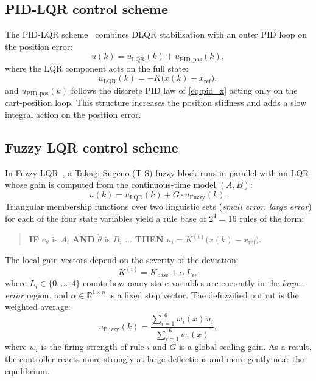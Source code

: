 \documentclass[twocolumn]{svjour3}
\begin{document}
\subsection{PID-LQR control scheme}

The PID-LQR scheme~\cite{Prasad2014,Nguyen2024} combines DLQR stabilisation with an outer PID loop on the position
error:
\begin{equation}
u(k) = u_\mathrm{LQR}(k) + u_\mathrm{PID,pos}(k),
\end{equation}
where the LQR component acts on the full state:
\begin{equation}
u_\mathrm{LQR}(k) = -K\bigl(x(k) - x_\mathrm{ref}\bigr),
\end{equation}
and $u_\mathrm{PID,pos}(k)$ follows the discrete PID law of \eqref{eq:pid_x} acting only on the
cart-position loop. This structure increases the position stiffness and adds a slow integral
action on the position error.

\subsection{Fuzzy LQR control scheme}

In Fuzzy-LQR~\cite{Nguyen2024}, a Takagi-Sugeno (T-S) fuzzy block runs in parallel with an LQR
whose gain is computed from the continuous-time model $(A,B)$:
\begin{equation}
u(k) = u_\mathrm{LQR}(k) + G\cdot u_\mathrm{Fuzzy}(k).
\end{equation}
Triangular membership functions over two linguistic sets (\emph{small error},
\emph{large error}) for each of the four state variables yield a rule base of
$2^4=16$ rules of the form:
\begin{quote}
\textbf{IF} $e_\theta$ is $A_i$ \textbf{AND} $\dot\theta$ is $B_i$
$\ldots$ \textbf{THEN} $u_i = K^{(i)}\bigl(x(k)-x_\mathrm{ref}\bigr)$.
\end{quote}
The local gain vectors depend on the severity of the deviation:
\begin{equation}
K^{(i)} = K_\mathrm{base} + \alpha\,L_i,
\end{equation}
where $L_i\in\{0,\ldots,4\}$ counts how many state variables are currently in the
\emph{large-error} region, and $\alpha\in\mathbb{R}^{1\times n}$ is a fixed step vector. The defuzzified output is the
weighted average:
\begin{equation}
u_\mathrm{Fuzzy}(k) = \frac{\displaystyle\sum_{i=1}^{16}w_i(x)\,u_i}
                           {\displaystyle\sum_{i=1}^{16}w_i(x)},
\end{equation}
where $w_i$ is the firing strength of rule $i$ and $G$ is a global scaling gain. As a result,
the controller reacts more strongly at large deflections and more gently near the equilibrium.
\end{document}
